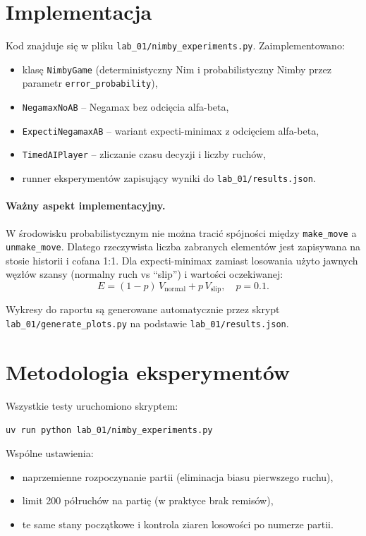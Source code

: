 \documentclass[11pt,a4paper]{article}
\begin{document}
\section{Implementacja}
Kod znajduje się w pliku \texttt{lab\_01/nimby\_experiments.py}.
Zaimplementowano:
\begin{itemize}
    \item klasę \texttt{NimbyGame} (deterministyczny Nim i probabilistyczny Nimby przez parametr \texttt{error\_probability}),
    \item \texttt{NegamaxNoAB} -- Negamax bez odcięcia alfa-beta,
    \item \texttt{ExpectiNegamaxAB} -- wariant expecti-minimax z odcięciem alfa-beta,
    \item \texttt{TimedAIPlayer} -- zliczanie czasu decyzji i liczby ruchów,
    \item runner eksperymentów zapisujący wyniki do \texttt{lab\_01/results.json}.
\end{itemize}

\paragraph{Ważny aspekt implementacyjny.}
W środowisku probabilistycznym nie można tracić spójności między \texttt{make\_move}
a \texttt{unmake\_move}. Dlatego rzeczywista liczba zabranych elementów jest zapisywana
na stosie historii i cofana 1:1. Dla expecti-minimax zamiast losowania użyto jawnych
węzłów szansy (normalny ruch vs ``slip'') i wartości oczekiwanej:
\[
E = (1-p)\,V_{\text{normal}} + p\,V_{\text{slip}}, \quad p=0.1.
\]

Wykresy do raportu są generowane automatycznie przez skrypt
\texttt{lab\_01/generate\_plots.py} na podstawie \texttt{lab\_01/results.json}.

\section{Metodologia eksperymentów}
Wszystkie testy uruchomiono skryptem:
\begin{center}
\texttt{uv run python lab\_01/nimby\_experiments.py}
\end{center}

Wspólne ustawienia:
\begin{itemize}
    \item naprzemienne rozpoczynanie partii (eliminacja biasu pierwszego ruchu),
    \item limit 200 półruchów na partię (w praktyce brak remisów),
    \item te same stany początkowe i kontrola ziaren losowości po numerze partii.
\end{itemize}
\end{document}
